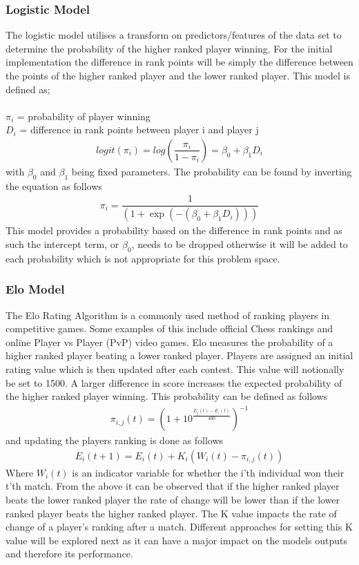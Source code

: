 \documentclass[12pt,a4paper]{article}
\begin{document}
\subsubsection{Logistic Model}
The logistic model utilises a transform on predictors/features of the data set to
determine the probability of the higher ranked player winning. For the initial
implementation the difference in rank points will be simply the difference
between the points of the higher ranked player and the lower ranked player. This
model is defined as;
\\
\\
$\pi_i$ = probability of player winning \\
$D_i$ = difference in rank points between player i and player j \\
\begin{gather}
  logit(\pi_i) = log(\dfrac{\pi_i}{1-\pi_i}) = \beta_0 + \beta_1 D_i
\end{gather}
with $\beta_0$ and $\beta_1$ being fixed parameters.
The probability can be found by inverting the equation as follows
\begin{gather}
  \pi_i = \dfrac{1}{(1+\exp(-(\beta_0 + \beta_1 D_i)))}
\end{gather}
This model provides a probability based on the difference in rank points and as such the
intercept term, or $\beta_0$, needs to be dropped otherwise it will be added to each
probability which is not appropriate for this problem space.
\subsubsection{Elo Model}
The Elo Rating Algorithm is a commonly used method of ranking players in competitive
games. Some examples of this include official Chess rankings and online Player vs Player (PvP)
video games. Elo measures the probability of a higher ranked player beating a
lower ranked player. Players are assigned an initial rating value which is then updated after each contest.
This value will notionally be set to 1500. A larger difference in score increases the expected probability
of the higher ranked player winning. This probability can be defined as follows
\begin{gather}
  \pi_{i,j}(t) = (1 + 10^{\tfrac{E_j(t)-E_i(t)}{400}})^{-1}
\end{gather}
and updating the players ranking is done as follows
\begin{gather}
  E_i(t+1) = E_i(t) +K_i(W_i(t)-\pi_{i,j}(t))
\end{gather}
Where $W_i(t)$ is an indicator variable for whether the i'th individual won their
t'th match. From the above it can be observed that if the higher ranked player
beats the lower ranked player the rate of change will be lower than if the lower
ranked player beats the higher ranked player.
The K value impacts the rate of change of a player's ranking after a match. Different
approaches for setting this K value will be explored next as it can have a major
impact on the models outputs and therefore its performance.
\end{document}
